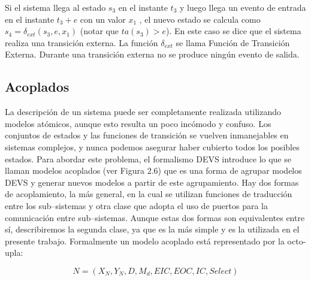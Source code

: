 \documentclass[a4paper,	11pt]{report}
\begin{document}
Si el sistema llega al estado $s_3$ en el instante $t_3$ y luego llega un evento de entrada en el instante $t_3 + e$ con un valor $x_1$ , el nuevo estado se calcula como $s_4 = \delta_{ext} (s_3 , e, x_1 )$ (notar que $ta(s_3 ) > e$). En este caso se dice que el sistema realiza una transición externa. La función $\delta_{ext}$ se llama Función de Transición Externa. Durante una transición externa no se produce ningún evento de salida.


\subsection{Acoplados}
La descripción de un sistema puede ser completamente realizada utilizando modelos atómicos, aunque esto resulta un poco incómodo y confuso. Los conjuntos de estados y las funciones de transición se vuelven inmanejables en sistemas complejos, y nunca podemos asegurar haber cubierto todos los posibles estados.
Para abordar este problema, el formalismo DEVS introduce lo que se llaman modelos acoplados (ver Figura 2.6) que es una forma de agrupar modelos DEVS y generar nuevos modelos a partir de este agrupamiento.
Hay dos formas de acoplamiento, la más general, en la cual se utilizan funciones de traducción entre los sub–sistemas y otra clase que adopta el uso de puertos para la comunicación entre sub–sistemas. Aunque estas dos formas son equivalentes entre sí, describiremos la segunda clase, ya que es la más simple y es la utilizada en el presente trabajo.
Formalmente un modelo acoplado está representado por la octo-upla:

\begin{equation}
N = (X_N , Y_N , D, {M_d }, EIC, EOC, IC, Select)
\end{equation}
\end{document}
